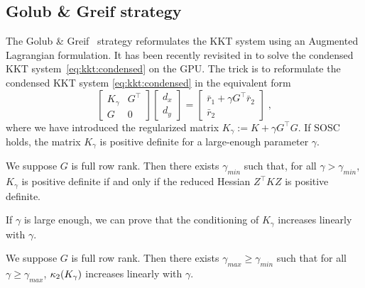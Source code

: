 \subsection{Golub \& Greif strategy}
\label{sec:kkt:golubgreif}
The Golub \& Greif~\cite{golub2003solving} strategy reformulates the KKT system
using an Augmented Lagrangian formulation.
It has been recently revisited in \cite{regev2023hykkt}
to solve the condensed KKT system~\eqref{eq:kkt:condensed} on the GPU.
The trick is to reformulate the condensed KKT system \eqref{eq:kkt:condensed} in the equivalent form
\begin{equation}
  \label{eq:kkt:hykkt}
  \begin{bmatrix}
    K_\gamma & G^\top \\
    G & 0
  \end{bmatrix}
  \begin{bmatrix}
    d_x \\ d_y
  \end{bmatrix}
  =
  \begin{bmatrix}
    \bar{r}_1 + \gamma G^\top \bar{r}_2 \\
    \bar{r}_2
  \end{bmatrix} \; ,
\end{equation}
where we have introduced the regularized matrix $K_\gamma := K + \gamma G^\top G$.
If SOSC holds, the matrix $K_\gamma$ is positive definite for a large-enough parameter $\gamma$.
\begin{proposition}
  \label{prop:kkt:hykkt:pd}
  We suppose $G$ is full row rank. Then there exists $\gamma_{min}$
  such that, for all $\gamma > \gamma_{min}$, $K_\gamma$ is positive definite
  if and only if the reduced Hessian $Z^\top K Z$ is positive definite.
\end{proposition}
If $\gamma$ is large enough, we can prove that the conditioning
of $K_\gamma$ increases linearly with $\gamma$.
\begin{proposition}
  \label{prop:kkt:hykkt:cond}
  We suppose $G$ is full row rank. Then there exists $\gamma_{max}
  \geq \gamma_{min}$ such that for all $\gamma \geq \gamma_{max}$,
  $\kappa_2(K_\gamma)$ increases linearly with $\gamma$.
\end{proposition}


